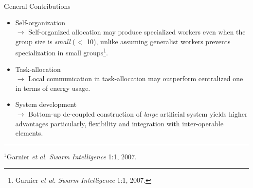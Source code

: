 \documentclass{beamer}
\begin{document}
\begin{frame}[t]{General Contributions}
\begin{itemize}
    \item \normalsize \alert{Self-organization}\\ 
$\rightarrow$ \small Self-organized allocation may produce specialized workers even when the group size is \textit{small} ($<$ 10), unlike assuming generalist workers prevents specialization in small groups\footnote{\scriptsize Garnier \textit{et al. Swarm Intelligence} 1:1, 2007.}.
    \item \normalsize \alert{Task-allocation}\\
$\rightarrow$ \small  Local communication in task-allocation may outperform centralized one in terms of energy usage.
\item \normalsize \alert{System development}\\
$\rightarrow$ \small Bottom-up de-coupled construction of \textit{large} artificial system yields higher advantages particularly, flexibility and integration with inter-operable elements.%
\end{itemize}
%
\hrule
\scriptsize $^1$Garnier \textit{et al. Swarm Intelligence} 1:1, 2007.
\end{frame}	
\end{document}
